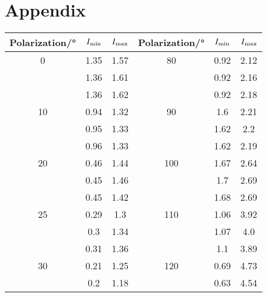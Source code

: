 \section{Appendix}
\begin{table}[H]
	\centering
	\begin{tabular}{S[table-format = 2.0] S S S[table-format = 2.0] S S}
		\toprule
		{Polarization/°} & {$I_\text{min}$} & {$I_\text{max}$} & {Polarization/°} & {$I_\text{min}$} & {$I_\text{max}$} \\
		                & 1.35          & 1.57          & 80               & 0.92          & 2.12          \\
		                 & 1.36          & 1.61          &                  & 0.92          & 2.16          \\
		                 & 1.36          & 1.62          &                  & 0.92          & 2.18          \\
		10               & 0.94          & 1.32          & 90               & 1.6           & 2.21          \\
		                 & 0.95          & 1.33          &                  & 1.62          & 2.2           \\
		                 & 0.96          & 1.33          &                  & 1.62          & 2.19          \\
		20               & 0.46          & 1.44          & 100              & 1.67          & 2.64          \\
		                 & 0.45          & 1.46          &                  & 1.7           & 2.69          \\
		                 & 0.45          & 1.42          &                  & 1.68          & 2.69          \\
		25               & 0.29          & 1.3           & 110              & 1.06          & 3.92          \\
		                 & 0.3           & 1.34          &                  & 1.07          & 4.0           \\
		                 & 0.31          & 1.36          &                  & 1.1           & 3.89          \\
		30               & 0.21          & 1.25          & 120              & 0.69          & 4.73          \\
		                 & 0.2           & 1.18          &                  & 0.63          & 4.54          \\

\end{tabular}
\end{table}
